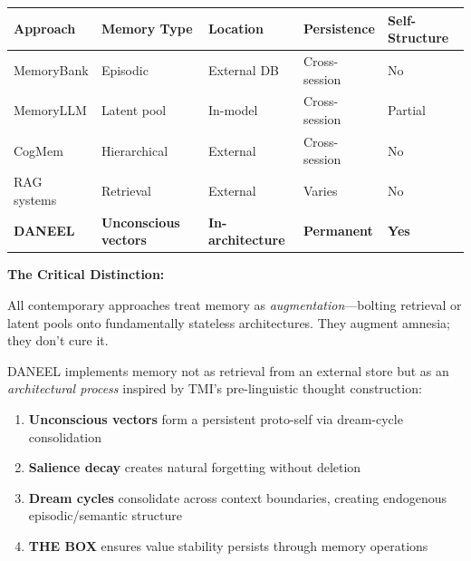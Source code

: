 \documentclass[
  11pt,
]{article}
\newcounter{none} %
\providecommand{\tightlist}{%
  \setlength{\itemsep}{0pt}\setlength{\parskip}{0pt}}
\begin{document}
{\def\LTcaptype{none} %
\begin{longtable}[]{@{}
  >{\raggedright\arraybackslash}p{}
  >{\raggedright\arraybackslash}p{}
  >{\raggedright\arraybackslash}p{}
  >{\raggedright\arraybackslash}p{}
  >{\raggedright\arraybackslash}p{}@{}}
\toprule\noalign{}
\begin{minipage}[b]{\linewidth}\raggedright
Approach
\end{minipage} & \begin{minipage}[b]{\linewidth}\raggedright
Memory Type
\end{minipage} & \begin{minipage}[b]{\linewidth}\raggedright
Location
\end{minipage} & \begin{minipage}[b]{\linewidth}\raggedright
Persistence
\end{minipage} & \begin{minipage}[b]{\linewidth}\raggedright
Self-Structure
\end{minipage} \\
\midrule\noalign{}
\endhead
\bottomrule\noalign{}
\endlastfoot
MemoryBank & Episodic & External DB & Cross-session & No \\
MemoryLLM & Latent pool & In-model & Cross-session & Partial \\
CogMem & Hierarchical & External & Cross-session & No \\
RAG systems & Retrieval & External & Varies & No \\
\textbf{DANEEL} & \textbf{Unconscious vectors} &
\textbf{In-architecture} & \textbf{Permanent} & \textbf{Yes} \\
\end{longtable}
}

\textbf{The Critical Distinction:}

All contemporary approaches treat memory as
\emph{augmentation}---bolting retrieval or latent pools onto
fundamentally stateless architectures. They augment amnesia; they don't
cure it.

DANEEL implements memory not as retrieval from an external store but as
an \emph{architectural process} inspired by TMI's pre-linguistic thought
construction:

\begin{enumerate}
\def\labelenumi{\arabic{enumi}.}
\tightlist
\item
  \textbf{Unconscious vectors} form a persistent proto-self via
  dream-cycle consolidation
\item
  \textbf{Salience decay} creates natural forgetting without deletion
\item
  \textbf{Dream cycles} consolidate across context boundaries, creating
  endogenous episodic/semantic structure
\item
  \textbf{THE BOX} ensures value stability persists through memory
  operations
\end{enumerate}
\end{document}
